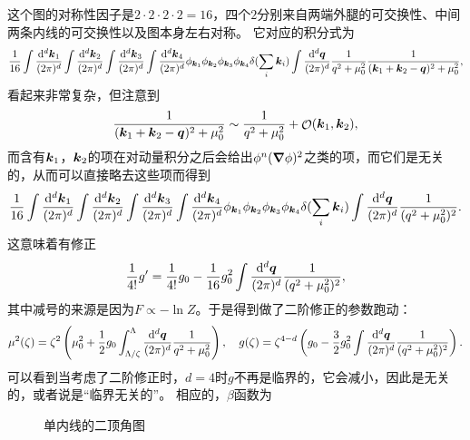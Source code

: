 \documentclass[hyperref, UTF8, a4paper]{ctexart}
\DeclareMathOperator{\bigO}{\mathcal{O}}
\begin{document}
这个图的对称性因子是$2 \cdot 2 \cdot 2 \cdot 2 = 16$，四个$2$分别来自两端外腿的可交换性、中间两条内线的可交换性以及图本身左右对称。
它对应的积分式为
\[
    \frac{1}{16} \int \frac{\dd[d]{\vb*{k}_1}}{(2\pi)^d} \int \frac{\dd[d]{\vb*{k}_2}}{(2\pi)^d} \int \frac{\dd[d]{\vb*{k}_3}}{(2\pi)^d} \int \frac{\dd[d]{\vb*{k}_4}}{(2\pi)^d} \phi_{\vb*{k}_1} \phi_{\vb*{k}_2} \phi_{\vb*{k}_3} \phi_{\vb*{k}_4} \delta(\sum_{i} \vb*{k}_i) \int \frac{\dd[d]{\vb*{q}}}{(2\pi)^d} \frac{1}{q^2 + \mu_0^2} \frac{1}{(\vb*{k}_1 + \vb*{k}_2 - \vb*{q})^2 + \mu_0^2},
\]
看起来非常复杂，但注意到
\[
    \frac{1}{(\vb*{k}_1 + \vb*{k}_2 - \vb*{q})^2 + \mu_0^2} \sim \frac{1}{q^2 + \mu_0^2} + \bigO(\vb*{k}_1, \vb*{k}_2),
\]
而含有$\vb*{k}_1$，$\vb*{k}_2$的项在对动量积分之后会给出$\phi^n (\grad{\phi})^2$之类的项，而它们是无关的，从而可以直接略去这些项而得到
\[
    \frac{1}{16} \int \frac{\dd[d]{\vb*{k}_1}}{(2\pi)^d} \int \frac{\dd[d]{\vb*{k}_2}}{(2\pi)^d} \int \frac{\dd[d]{\vb*{k}_3}}{(2\pi)^d} \int \frac{\dd[d]{\vb*{k}_4}}{(2\pi)^d} \phi_{\vb*{k}_1} \phi_{\vb*{k}_2} \phi_{\vb*{k}_3} \phi_{\vb*{k}_4} \delta(\sum_{i} \vb*{k}_i) \int \frac{\dd[d]{\vb*{q}}}{(2\pi)^d} \frac{1}{(q^2 + \mu_0^2)^2}.
\]
这意味着有修正
\[
    \frac{1}{4!} g' = \frac{1}{4!} g_0 - \frac{1}{16} g_0^2 \int \frac{\dd[d]{\vb*{q}}}{(2\pi)^d} \frac{1}{(q^2 + \mu_0^2)^2},
\]
其中减号的来源是因为$F \propto - \ln Z$。于是得到做了二阶修正的参数跑动：
\begin{equation}
    \mu^2(\zeta) = \zeta^2 \left( \mu_0^2 + \frac{1}{2} g_0 \int^\Lambda_{\Lambda/\zeta} \frac{\dd[d]{\vb*{q}}}{(2\pi)^d} \frac{1}{q^2 + \mu_0^2} \right), \quad g(\zeta) = \zeta^{4-d} \left( g_0 - \frac{3}{2} g_0^2 \int \frac{\dd[d]{\vb*{q}}}{(2\pi)^d} \frac{1}{(q^2 + \mu_0^2)^2} \right).
\end{equation}
可以看到当考虑了二阶修正时，$d=4$时$g$不再是临界的，它会减小，因此是无关的，或者说是“临界无关的”。
相应的，$\beta$函数为


\begin{figure}
    \centering
    \caption{单内线的二顶角图}
    \label{fig:single-second-order-correction}
\end{figure}
\end{document}
